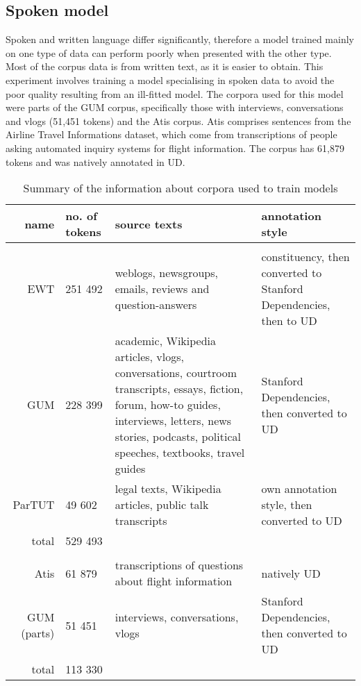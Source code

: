 \subsection{Spoken model}
Spoken and written language differ significantly, therefore a model trained mainly on one type of data can perform poorly when presented with the other type. Most of the corpus data is from written text, as it is easier to obtain. This experiment involves training a model specialising in spoken data to avoid the poor quality resulting from an ill-fitted model. The corpora used for this model were parts of the GUM corpus, specifically those with interviews, conversations and vlogs (51,451 tokens) and the Atis corpus. Atis comprises sentences from the Airline Travel Informations dataset, which come from transcriptions of people asking automated inquiry systems for flight information. The corpus has 61,879 tokens and was natively annotated in UD. 

\begin{table}[hbt!]
\begin{adjustwidth}{-20pt}{20pt}
	\begin{tabular}{r || p{2.5cm} | p{5cm} | p{3.5cm}}
		name & no. of tokens & source texts & annotation style\\
		\hline\hline
		\rowcolor{lightgray} \multicolumn{4}{c}{combined model}\\
		\hline\hline
		EWT & 251 492 & weblogs, newsgroups, emails, reviews and question-answers & constituency, then converted to Stanford Dependencies, then to UD\\\hline
		GUM & 228 399 & academic, Wikipedia articles, vlogs, conversations, courtroom transcripts, essays, fiction, forum, how-to guides, interviews, letters, news stories, podcasts, political speeches, textbooks, travel guides & Stanford Dependencies, then converted to UD\\\hline
		ParTUT & 49 602 & legal texts, Wikipedia articles, public talk transcripts & own annotation style, then converted to UD\\\hline
		total & \multicolumn{3}{l}{529 493}\\
		\hline\hline
		\rowcolor{lightgray} \multicolumn{4}{c}{spoken model}\\
		\hline\hline
		Atis & 61 879 & transcriptions of questions about flight information & natively UD\\\hline
		GUM (parts) & 51 451 & interviews, conversations, vlogs & Stanford Dependencies, then converted to UD\\\hline
		total & \multicolumn{3}{l}{113 330}
	\end{tabular}
\end{adjustwidth}
\caption{Summary of the information about corpora used to train models}
\end{table}

